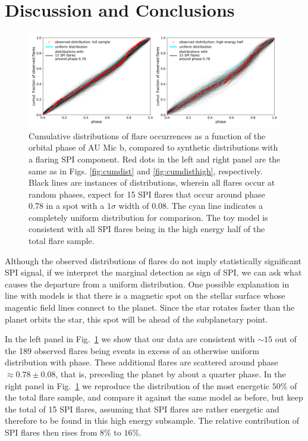 \documentclass[fleqn,usenatbib,letters]{mnras}%
\begin{document}
\section{Discussion and Conclusions}
\label{sec:discussion}
\begin{figure}
\includegraphics[width=\hsize]{figures/2021_06_10_speculative_SPI_spot.png} 
\caption{Cumulative distributions of flare occurrences as a function of the orbital phase of AU Mic b, compared to synthetic distributions with a flaring SPI component. Red dots in the left and right panel are the same as in Figs. \ref{fig:cumdist} and \ref{fig:cumdisthigh}, respectively. Black lines are instances of distributions, wherein all flares occur at random phases, expect for 15 SPI flares that occur around phase 0.78 in a spot with a $1\sigma$ width of 0.08. The cyan line indicates a completely uniform distribution for comparison. The toy model is consistent with all SPI flares being in the high energy half of the total flare sample.}
\label{fig:speculative}
\end{figure}

Although the observed distributions of flares do not imply statistically significant SPI signal, if we interpret the marginal detection as sign of SPI, we can ask what causes the departure from a uniform distribution. One possible explanation in line with models is that there is a magnetic spot on the stellar surface whose magentic field lines connect to the planet. Since the star rotates faster than the planet orbits the star, this spot will be ahead of the subplanetary point. 

In the left panel in Fig.~\ref{fig:speculative} we show that our data are consistent with $\sim 15$ out of the 189 observed flares being events in excess of an otherwise uniform distribution with phase. These additional flares are scattered around phase$\approx 0.78\pm0.08$, that is, preceding the planet by about a quarter phase. In the right panel in Fig.~\ref{fig:speculative} we reproduce the distribution of the most energetic $50\%$ of the total flare sample, and compare it against the same model as before, but keep the total of 15 SPI flares, assuming that SPI flares are rather energetic and therefore to be found in this high energy subsample. The relative contribution of SPI flares then rises from $8\%$ to $16\%$.
\end{document}
